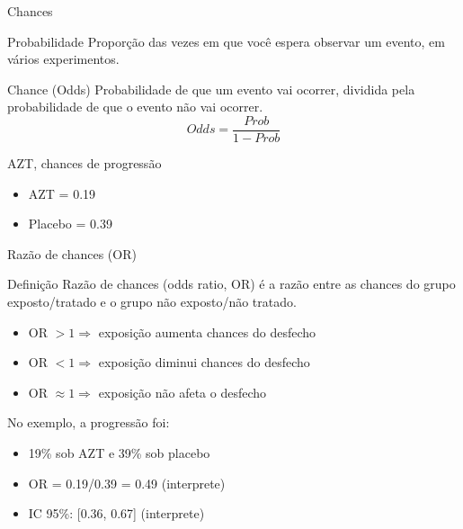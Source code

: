 \documentclass{beamer}
\begin{document}
\begin{frame}{Chances}
  \begin{block}{Probabilidade}
    Proporção das vezes em que você espera observar um evento, em vários experimentos.
  \end{block}
  \begin{block}{Chance (Odds)}
    Probabilidade de que um evento vai ocorrer, dividida pela probabilidade de que o evento não vai ocorrer.
    \begin{displaymath}
      Odds = \frac{Prob}{1- Prob}
    \end{displaymath}
  \end{block}
  \begin{exampleblock}{AZT, chances de progressão}
    \begin{itemize}
    \item AZT = 0.19
    \item Placebo = 0.39
    \end{itemize}
  \end{exampleblock}
\end{frame}

\begin{frame}{Razão de chances (OR)}
  \begin{block}{Definição}
    Razão de chances (odds ratio, OR) é a razão entre as chances do grupo exposto/tratado e o grupo não exposto/não tratado.
  \end{block}
  \begin{itemize}
  \item OR $> 1 \Rightarrow$ exposição aumenta chances do desfecho
  \item OR $< 1 \Rightarrow$ exposição diminui chances do desfecho
  \item OR $\approx 1 \Rightarrow$ exposição não afeta o desfecho
  \end{itemize}
  \begin{exampleblock}{No exemplo, a progressão foi:}
    \begin{itemize}
    \item 19\% sob AZT e 39\% sob placebo
    \item OR = 0.19/0.39 = 0.49 (interprete)
    \item<2-> IC 95\%: [0.36, 0.67] (interprete)
    \end{itemize}
  \end{exampleblock}
\end{frame}
\end{document}
